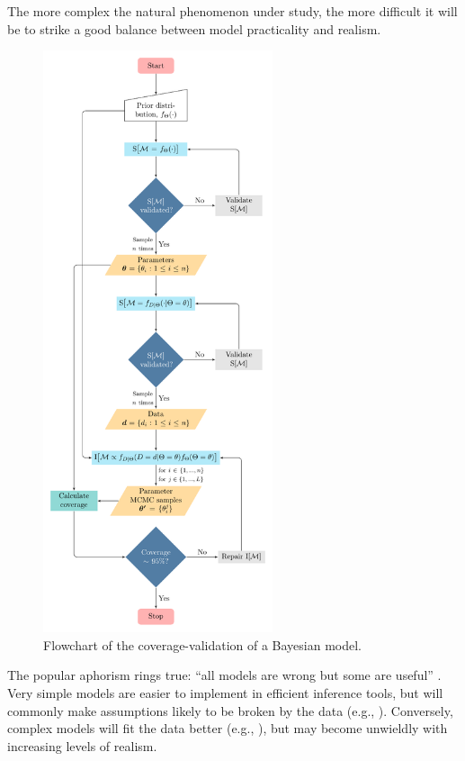 \documentclass[oneside]{article}
\begin{document}
The more complex the natural phenomenon under study,
the more difficult it will be to strike a good balance
between model practicality and realism.
\begin{figure}
  \includegraphics[width=6.75cm]{../figures/flowchart.pdf}
  \caption{Flowchart of the coverage-validation of a Bayesian model.}
    \label{fig:flowchart}
\end{figure}
The popular aphorism rings true: ``all models are wrong but some are useful''
\citep{box79}.
Very simple models are easier to implement in efficient inference tools, but will
commonly make assumptions likely to be broken by the data (e.g.,
\citealp{sullivan97,mendes17,mendes19}).
Conversely, complex models will fit the data better (e.g., \citealp{ogilvie22}), but
may become unwieldly with increasing levels of realism.
\end{document}
